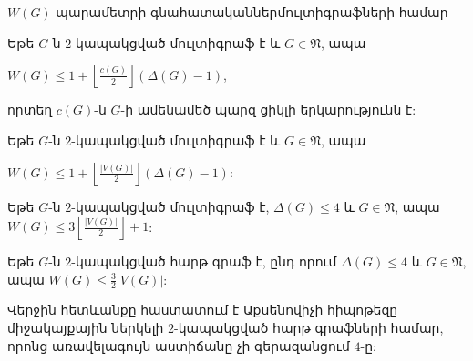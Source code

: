 \begin{frame}[shrink]{$W(G)$ պարամետրի գնահատականներ}{մուլտիգրաֆների համար}
\begin{theorem}[1.2.8]
Եթե $G$-ն $2$-կապակցված մուլտիգրաֆ է և $G\in \mathfrak{N}$, ապա
\begin{center}
$W(G)\leq 1+\left\lfloor \frac{c(G)}{2}\right\rfloor(\Delta(G)-1)$,
\end{center}
որտեղ $c(G)$-ն $G$-ի ամենամեծ պարզ ցիկլի երկարությունն է:
\end{theorem}

\begin{hide}
\begin{corollary}
\label{c1_upper_V/2} Եթե $G$-ն $2$-կապակցված մուլտիգրաֆ է և $G\in \mathfrak{N}$, ապա
\begin{center}
$W(G)\leq 1+\left\lfloor \frac{\vert
V(G)\vert}{2}\right\rfloor(\Delta(G)-1)$:
\end{center}
\end{corollary}

\begin{corollary}
\label{c1_upper_Delta4} Եթե $G$-ն $2$-կապակցված մուլտիգրաֆ է,
$\Delta(G)\leq 4$ և $G\in \mathfrak{N}$, ապա
$W(G)\leq 3\left\lfloor \frac{\vert V(G)\vert}{2}\right\rfloor+1$:
\end{corollary}
\end{hide}

\begin{corollary}[1.2.11]
Եթե $G$-ն $2$-կապակցված հարթ գրաֆ է, ընդ որում
$\Delta(G)\leq 4$ և $G\in \mathfrak{N}$, ապա 
$W(G)\leq \frac{3}{2}\vert V(G)\vert$:
\end{corollary}

Վերջին հետևանքը հաստատում է Աքսենովիչի հիպոթեզը միջակայքային ներկելի $2$-կապակցված հարթ գրաֆների համար, որոնց առավելագույն աստիճանը չի գերազանցում $4$-ը:
\end{frame}

